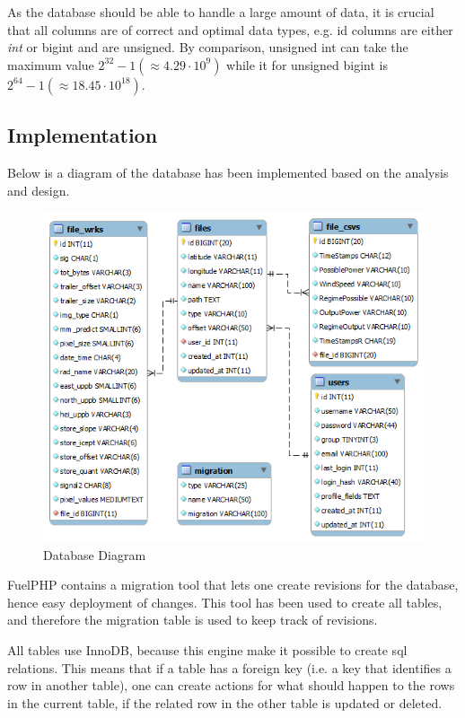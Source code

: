 As the database should be able to handle a large amount of data, it is crucial that all columns are of correct and optimal data types, e.g. \textsf{id} columns are either \textit{int} or \textsf{bigint} and are \textsf{unsigned}. By comparison, \textsf{unsigned int} can take the maximum value $2^{32}-1 (\approx 4.29 \cdot 10^{9})$ while it for \textsf{unsigned bigint} is $ 2^{64}-1 (\approx 18.45 \cdot 10^{18})$.

\subsection{Implementation}

Below is a diagram of the database has been implemented based on the analysis and design.

\begin{figure}[htbp]
   \centering
   \includegraphics[width=1\linewidth]{figure/db}
   \caption{Database Diagram}
\end{figure}

FuelPHP contains a \textsf{migration} tool that lets one create revisions for the database, hence easy deployment of changes. This tool has been used to create all tables, and therefore the \textsf{migration} table is used to keep track of revisions.

All tables use \textsf{InnoDB}, because this engine make it possible to create sql relations. This means that if a table has a foreign key (i.e. a key that identifies a row in another table), one can create actions for what should happen to the rows in the current table, if the related row in the other table is \textsf{updated} or \textsf{deleted}.

